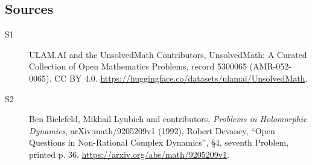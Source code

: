 \documentclass[11pt]{article}
\begin{document}
\subsection{Sources}
\begin{description}
\item[\hypertarget{source:5300065:1}{S1}] ULAM.AI and the UnsolvedMath Contributors, UnsolvedMath: A Curated Collection of Open Mathematics Problems, record 5300065 (AMR-052-0065). CC BY 4.0. \url{https://huggingface.co/datasets/ulamai/UnsolvedMath}.
\item[\hypertarget{source:5300065:2}{S2}] Ben Bielefeld, Mikhail Lyubich and contributors, \emph{Problems in Holomorphic Dynamics}, arXiv:math/9205209v1 (1992), Robert Devaney, ``Open Questions in Non-Rational Complex Dynamics'', \S4, seventh Problem, printed p. 36. \url{https://arxiv.org/abs/math/9205209v1}.
\end{description}
\label{end:5300065}
\end{document}
